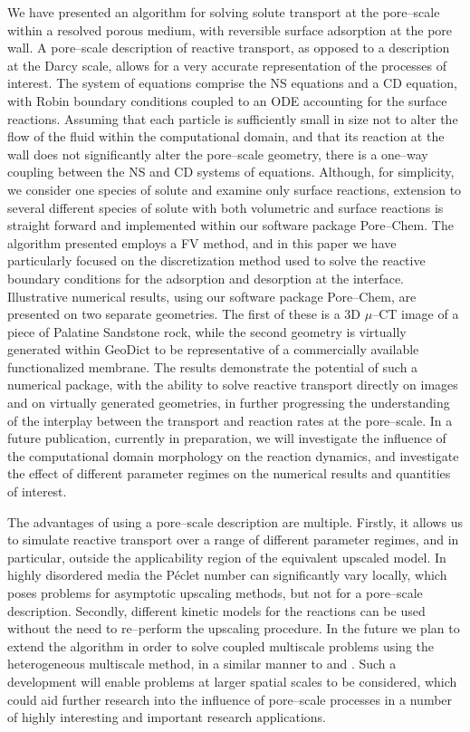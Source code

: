 \documentclass[preprint, 1p, authoryear]{elsarticle}
\begin{document}
We have presented an algorithm for solving    solute transport  at the pore--scale within a resolved porous medium, with reversible surface adsorption at the pore wall.   A pore--scale description of reactive transport, as opposed to a description at the Darcy scale,  allows for a very accurate representation of the processes of interest. 
The system of equations comprise the NS equations and  a CD equation, with Robin boundary conditions coupled to an ODE accounting for the surface reactions.  Assuming that  each particle is sufficiently small in size not to alter the flow of the fluid within the computational domain, and that its reaction at the wall does not significantly alter the pore--scale geometry, there is  a one--way coupling between the NS and CD systems of equations.   Although, for simplicity, we  consider one species of solute and  examine only surface reactions, extension to several different species of solute with both volumetric and surface reactions is straight forward and implemented within our software package Pore--Chem.  
 The algorithm presented employs a FV method,  and in this paper we have particularly focused on the discretization method used to solve the reactive  boundary conditions for the adsorption and desorption at the interface. 
 Illustrative numerical results, using our software package Pore--Chem, are presented on two separate geometries. The first of these  is a 3D $\mu$--CT image of a piece of Palatine Sandstone rock, while the second geometry is virtually generated within GeoDict \citep{Geodict} to be representative of a commercially available functionalized membrane.   The results demonstrate the potential of such a numerical package, with the ability to solve reactive transport directly on images and on virtually generated geometries, in further progressing the understanding of the interplay between the transport and reaction rates at the pore--scale.  In a future publication, currently in preparation, we will investigate the influence of the computational domain morphology on the reaction dynamics, and investigate the effect of different parameter regimes on the numerical results and quantities of interest. 

The advantages of using a pore--scale description are multiple. Firstly, it allows us to simulate reactive transport over a range of different parameter regimes, and in particular, outside the applicability region of the equivalent upscaled model. In  highly disordered media the P\'eclet number can significantly vary locally, which poses problems for asymptotic upscaling methods, but not for a pore--scale description.   Secondly, different kinetic models for the reactions can be used without the need to re--perform the upscaling procedure.    In the future we plan to extend the algorithm in order to solve coupled multiscale problems using the heterogeneous multiscale method, in a similar manner to   \citet{Battiato2011Hybrid} and \citet{Iliev2014Multiscale}.  Such a development will enable problems at larger spatial scales to be considered, which could aid further research into the influence of pore--scale processes in a number of highly interesting and important research applications. 







\end{document}
